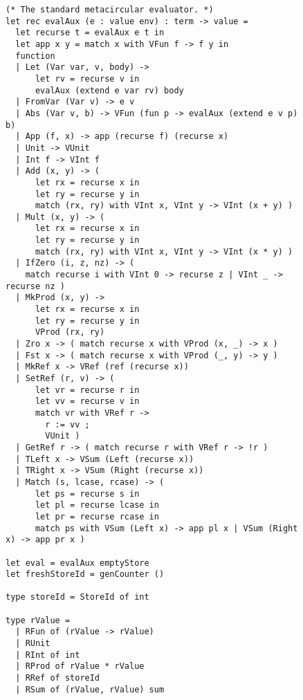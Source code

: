 \begin{figure}[H]
\ContinuedFloat
\begin{verbatim}
(* The standard metacircular evaluator. *)
let rec evalAux (e : value env) : term -> value =
  let recurse t = evalAux e t in
  let app x y = match x with VFun f -> f y in
  function
  | Let (Var var, v, body) ->
      let rv = recurse v in
      evalAux (extend e var rv) body
  | FromVar (Var v) -> e v
  | Abs (Var v, b) -> VFun (fun p -> evalAux (extend e v p) b)
  | App (f, x) -> app (recurse f) (recurse x)
  | Unit -> VUnit
  | Int f -> VInt f
  | Add (x, y) -> (
      let rx = recurse x in
      let ry = recurse y in
      match (rx, ry) with VInt x, VInt y -> VInt (x + y) )
  | Mult (x, y) -> (
      let rx = recurse x in
      let ry = recurse y in
      match (rx, ry) with VInt x, VInt y -> VInt (x * y) )
  | IfZero (i, z, nz) -> (
    match recurse i with VInt 0 -> recurse z | VInt _ -> recurse nz )
  | MkProd (x, y) ->
      let rx = recurse x in
      let ry = recurse y in
      VProd (rx, ry)
  | Zro x -> ( match recurse x with VProd (x, _) -> x )
  | Fst x -> ( match recurse x with VProd (_, y) -> y )
  | MkRef x -> VRef (ref (recurse x))
  | SetRef (r, v) -> (
      let vr = recurse r in
      let vv = recurse v in
      match vr with VRef r ->
        r := vv ;
        VUnit )
  | GetRef r -> ( match recurse r with VRef r -> !r )
  | TLeft x -> VSum (Left (recurse x))
  | TRight x -> VSum (Right (recurse x))
  | Match (s, lcase, rcase) -> (
      let ps = recurse s in
      let pl = recurse lcase in
      let pr = recurse rcase in
      match ps with VSum (Left x) -> app pl x | VSum (Right x) -> app pr x )

let eval = evalAux emptyStore
let freshStoreId = genCounter ()

type storeId = StoreId of int

type rValue =
  | RFun of (rValue -> rValue)
  | RUnit
  | RInt of int
  | RProd of rValue * rValue
  | RRef of storeId
  | RSum of (rValue, rValue) sum
\end{verbatim}
\end{figure}

